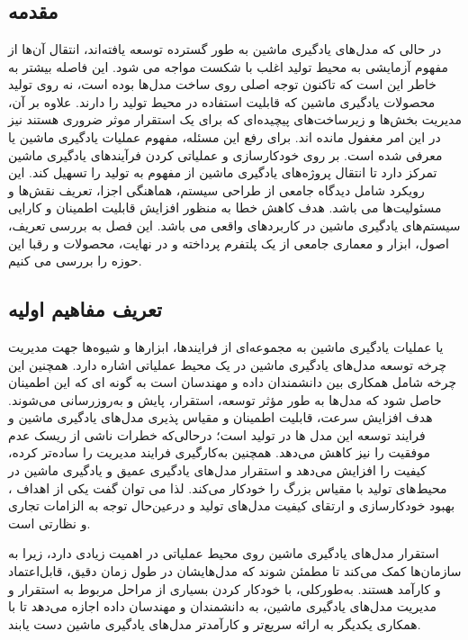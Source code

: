 \chapter{}\label{ch:HVS}
 
\section{مقدمه}
 
در حالی که مدل‌های یادگیری ماشین به طور گسترده‌ توسعه یافته‌اند، انتقال آن‌ها از مفهوم آزمایشی به محیط تولید اغلب با شکست مواجه می شود. این فاصله بیشتر به خاطر این است که تاکنون توجه اصلی روی ساخت مدل‌ها بوده است، نه روی تولید محصولات یادگیری ماشین که قابلیت استفاده در محیط تولید را دارند. علاوه بر آن، مدیریت بخش‌ها و زیرساخت‌های پیچیده‌ای که برای یک استقرار موثر ضروری هستند نیز در این امر مغفول مانده اند. برای رفع این مسئله، مفهوم عملیات یادگیری ماشین یا  معرفی شده است.  بر روی خودکارسازی و عملیاتی کردن فرآیندهای یادگیری ماشین تمرکز دارد تا انتقال پروژه‌های یادگیری ماشین از مفهوم به تولید را تسهیل کند. این رویکرد شامل دیدگاه جامعی از طراحی سیستم، هماهنگی اجزا، تعریف نقش‌ها و مسئولیت‌ها می باشد. هدف کاهش خطا به منظور افزایش قابلیت اطمینان و کارایی سیستم‌های یادگیری ماشین در کاربردهای واقعی می باشد. این فصل به بررسی تعریف، اصول، ابزار و معماری جامعی از یک پلتفرم   پرداخته و در نهایت، محصولات و رقبا این حوزه را بررسی می کنیم.

\section{تعریف مفاهیم اولیه}

 یا عملیات یادگیری ماشین به مجموعه‌ای از فرایندها، ابزارها و شیوه‌ها جهت مدیریت چرخه توسعه مدل‌های یادگیری ماشین در یک محیط عملیاتی اشاره دارد. همچنین این چرخه شامل همکاری بین دانشمندان داده و مهندسان  است به گونه ای که این اطمینان حاصل شود که مدل‌ها به طور مؤثر توسعه، استقرار، پایش و به‌روزرسانی می‌شوند. هدف  افزایش سرعت، قابلیت اطمینان و مقیاس پذیری مدل‌های یادگیری ماشین و فرایند توسعه این مدل ها در تولید است؛ درحالی‌که خطرات ناشی از ریسک عدم موفقیت را نیز کاهش می‌دهد. همچنین به‌کارگیری  فرایند مدیریت را ساده‌تر کرده، کیفیت را افزایش می‌دهد و استقرار مدل‌های یادگیری عمیق و یادگیری ماشین در محیط‌های تولید با مقیاس بزرگ را خودکار می‌کند. لذا می توان گفت یکی از اهداف ، بهبود خودکارسازی و ارتقای کیفیت مدل‌های تولید و درعین‌حال توجه به الزامات تجاری و نظارتی است. 
 
 
 استقرار مدل‌های یادگیری ماشین روی محیط عملیاتی در  اهمیت زیادی دارد، زیرا به سازمان‌ها کمک می‌کند تا مطمئن شوند که مدل‌هایشان در طول زمان دقیق، قابل‌اعتماد و کارآمد هستند. به‌طورکلی،  با خودکار کردن بسیاری از مراحل مربوط به استقرار و مدیریت مدل‌های یادگیری ماشین، به دانشمندان و مهندسان داده اجازه می‌دهد تا با همکاری یکدیگر به ارائه سریع‌تر و کارآمدتر مدل‌های یادگیری ماشین دست یابند. 

